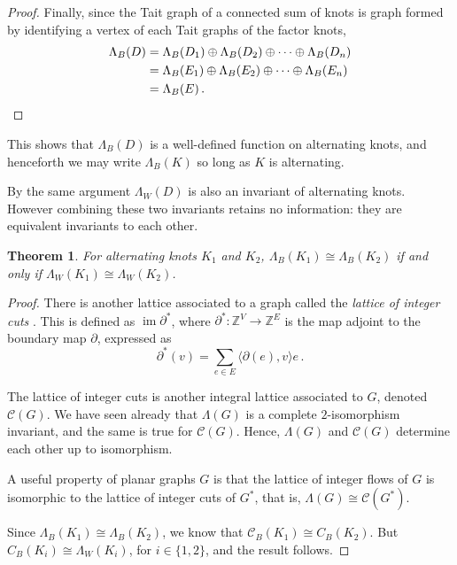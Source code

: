\documentclass[12pt]{report}
\newcommand{\Z}{\mathbb{Z}}
\newtheorem*{theorem}{Theorem}
\theoremstyle{upright}
\begin{document}
\begin{proof}
Finally, since the Tait graph of a connected sum of knots is graph formed by identifying a vertex of each Tait graphs of the factor knots,
\begin{align*}
	\Lambda_{B}(D) & = \Lambda_{B}(D_{1}) \oplus \Lambda_{B}(D_{2}) \oplus \cdots \oplus \Lambda_{B}(D_{n}) \\
	               & = \Lambda_{B}(E_{1}) \oplus \Lambda_{B}(E_{2}) \oplus \cdots \oplus \Lambda_{B}(E_{n})\\
	               & = \Lambda_{B}(E)\,. \qedhere \\ 
\end{align*}
\end{proof}

This shows that $\Lambda_{B}(D)$ is a well-defined function on alternating knots, and henceforth we may write $\Lambda_{B}(K)$ so long as $K$ is alternating.

By the same argument $\Lambda_{W}(D)$ is also an invariant of alternating knots. However combining these two invariants retains no information: they are equivalent invariants to each other.

\begin{theorem}
For alternating knots $K_{1}$ and $K_{2}$, $\Lambda_{B}(K_{1}) \cong \Lambda_{B}(K_{2})$ if and only if $\Lambda_{W}(K_{1}) \cong \Lambda_{W}(K_{2})$.
\end{theorem}

\begin{proof}
There is another lattice associated to a graph called the \textit{lattice of integer cuts} \cite{lattice-of-flows-cuts}. This is defined as $\operatorname{im} \partial^{*}$, where $\partial^{*}: \Z^{V} \longrightarrow \Z^{E}$ is the map adjoint to the boundary map $\partial$, expressed as
\[\partial^{*}(v) = \sum_{e \in E} \langle \partial(e), v \rangle e\,.\]

The lattice of integer cuts is another integral lattice associated to $G$, denoted $\mathcal{C}(G)$. We have seen already that $\Lambda(G)$ is a complete $2$-isomorphism invariant, and the same is true for $\mathcal{C}(G)$. Hence, $\Lambda(G)$ and $\mathcal{C}(G)$ determine each other up to isomorphism.

A useful property of planar graphs $G$ is that the lattice of integer flows of $G$ is isomorphic to the lattice of integer cuts of $G^{*}$, that is, $\Lambda(G) \cong \mathcal{C}(G^{*})$.

Since $\Lambda_{B}(K_{1}) \cong \Lambda_{B}(K_{2})$, we know that $\mathcal{C}_{B}(K_{1}) \cong C_{B}(K_{2})$. But $C_{B}(K_{i}) \cong \Lambda_{W}(K_{i})$, for $i \in \{1, 2\}$, and the result follows.
\end{proof}
\end{document}

